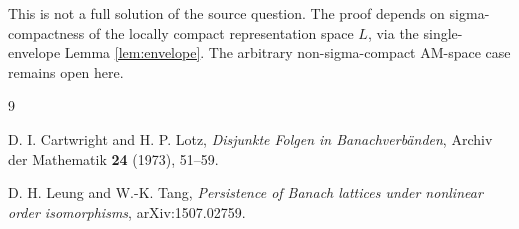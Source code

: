 \documentclass[11pt]{article}
\begin{document}
This is not a full solution of the source question.  The proof depends on
sigma-compactness of the locally compact representation space \(L\), via the
single-envelope Lemma \ref{lem:envelope}.  The arbitrary non-sigma-compact
AM-space case remains open here.

\begin{thebibliography}{9}

D. I. Cartwright and H. P. Lotz,
\emph{Disjunkte Folgen in Banachverbänden},
Archiv der Mathematik \textbf{24} (1973), 51--59.

D. H. Leung and W.-K. Tang,
\emph{Persistence of Banach lattices under nonlinear order isomorphisms},
arXiv:1507.02759.

\end{thebibliography}
\end{document}
